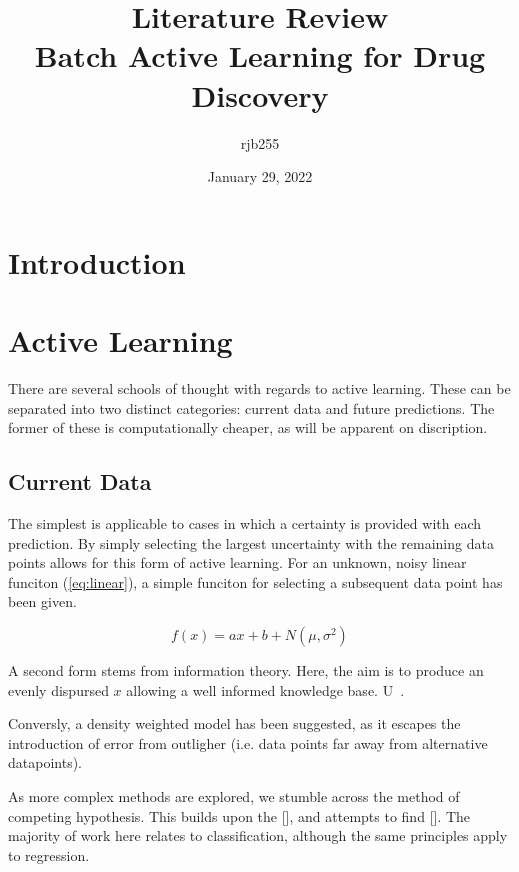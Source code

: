 \documentclass[a4paper, british]{article}
\begin{document}
\title{\Large{\textbf{Literature Review}}\\Batch Active Learning for Drug Discovery}
\author{rjb255}
\date{January 29, 2022}

\maketitle

\begin{abstract}

\end{abstract}

\section{Introduction}

\section{Active Learning}
\label{ch:Active Learning}
There are several schools of thought with regards to active learning. These can be separated into two distinct categories: current data and future predictions. The former of these is computationally cheaper, as will be apparent on discription.

\subsection{Current Data}
The simplest is applicable to cases in which a certainty is provided with each prediction. By simply selecting the largest uncertainty with the remaining data points allows for this form of active learning. For an unknown, noisy linear funciton (\ref{eq:linear}), a simple funciton for selecting a subsequent data point has been given.

\begin{equation}
    \label{eq:linear}
    f(x)=a x+b + N(\mu, \sigma^2)
\end{equation}

A second form stems from information theory. Here, the aim is to produce an evenly dispursed $x$ allowing a well informed knowledge base. U~\cite{Eisenstein_2020}.

Conversly, a density weighted model has been suggested, as it escapes the introduction of error from outligher (i.e. data points far away from alternative datapoints).

As more complex methods are explored, we stumble across the method of competing hypothesis. This builds upon the [], and attempts to find []. The majority of work here relates to classification, although the same principles apply to regression.
\end{document}
